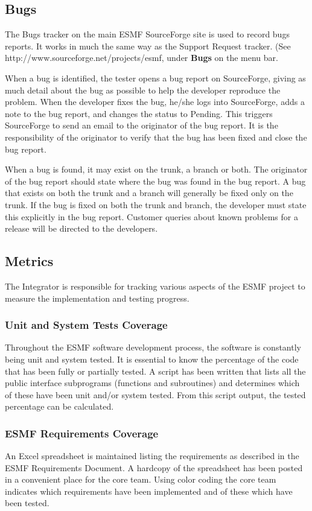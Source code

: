 \subsection{Bugs}

The Bugs tracker on the main ESMF SourceForge site is used
to record bugs reports.  It works in much the same way as
the Support Request tracker.
(See 
{http://www.sourceforge.net/projects/esmf}, under {\bf Bugs}
on the menu bar.

When a bug is identified, the tester opens a bug report on SourceForge, giving as much detail
about the bug as possible to help the developer reproduce the problem. When the developer
fixes the bug, he/she logs into SourceForge, adds a note to the bug report, and changes the status
to Pending. This triggers SourceForge to send an email to the originator of the bug report. It is
the responsibility of the originator to verify that the bug has been fixed and close the bug report.

When a bug is found, it may exist on the trunk, a branch or both. The originator of the bug report
should state where the bug was found in the bug report.  A bug that exists on both the trunk and a 
branch will generally be fixed only on the trunk. If the bug is fixed on both the trunk and branch, the 
developer must state this explicitly in the bug report.  Customer queries about known problems for a 
release will be directed to the developers.

\subsection{Metrics}

The Integrator is responsible for tracking various aspects of the
ESMF project to measure the implementation and testing progress.
\subsubsection{Unit and System Tests Coverage}
Throughout the ESMF software development process, the software is constantly
being unit and system tested. It is essential to know the percentage of the
code that has been fully or partially tested. A script has been written that 
lists all the public interface subprograms (functions and subroutines) and 
determines which of these have been unit and/or system tested. From this script
output, the tested percentage can be calculated.
\subsubsection{ESMF Requirements Coverage}
An Excel spreadsheet is maintained listing the requirements as described in the
ESMF Requirements Document. A hardcopy of the spreadsheet has been posted in a
convenient place for the core team. Using color coding the core team indicates
which requirements have been implemented and of these which have been tested.
